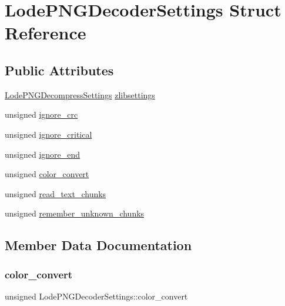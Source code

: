 \hypertarget{struct_lode_p_n_g_decoder_settings}{}\section{Lode\+P\+N\+G\+Decoder\+Settings Struct Reference}
\label{struct_lode_p_n_g_decoder_settings}
\subsection*{Public Attributes}
\begin{DoxyCompactItemize}
\item 
\mbox{\hyperlink{struct_lode_p_n_g_decompress_settings}{Lode\+P\+N\+G\+Decompress\+Settings}} \mbox{\hyperlink{struct_lode_p_n_g_decoder_settings_a9ae8fef9880bef97a3e932f8ea942ed8}{zlibsettings}}
\item 
unsigned \mbox{\hyperlink{struct_lode_p_n_g_decoder_settings_a6390c403d2a5718242337bbbaf15131d}{ignore\+\_\+crc}}
\item 
unsigned \mbox{\hyperlink{struct_lode_p_n_g_decoder_settings_a51c3ce791f1b1d325d5e1f7e18caeeea}{ignore\+\_\+critical}}
\item 
unsigned \mbox{\hyperlink{struct_lode_p_n_g_decoder_settings_aa8f3907b3dcaf09892a752806be2fc59}{ignore\+\_\+end}}
\item 
unsigned \mbox{\hyperlink{struct_lode_p_n_g_decoder_settings_af26f2b29cd338ce4476bee9571a0818a}{color\+\_\+convert}}
\item 
unsigned \mbox{\hyperlink{struct_lode_p_n_g_decoder_settings_aa1212905c3f73d9fffef2c04a220d951}{read\+\_\+text\+\_\+chunks}}
\item 
unsigned \mbox{\hyperlink{struct_lode_p_n_g_decoder_settings_a8775e4fc539dc457916720f52b442f27}{remember\+\_\+unknown\+\_\+chunks}}
\end{DoxyCompactItemize}


\subsection{Member Data Documentation}
\mbox{\label{struct_lode_p_n_g_decoder_settings_af26f2b29cd338ce4476bee9571a0818a}} 
\subsubsection{\texorpdfstring{color\_convert}{color\_convert}}
{\footnotesize\ttfamily unsigned Lode\+P\+N\+G\+Decoder\+Settings\+::color\+\_\+convert}

